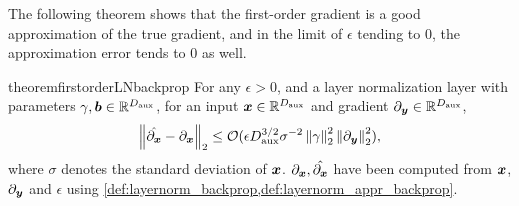 The following theorem shows that the first-order gradient is a good approximation of the true gradient, and in the limit of $\epsilon$ tending to $0$, the approximation error tends to $0$ as well.


\begin{restatable}{theorem}{firstorderLNbackprop}\label{thm:first_order_LN_backprop}
For any $\epsilon > 0$, and a layer normalization layer with parameters $\mathbf{\gamma}, {\bm{b}}\in \mathbb{R}^{ D_{\text{aux}} }$, for an input ${\bm{x}} \in \mathbb{R}^{ D_{\text{aux}} }$ and gradient $\partial_{{\bm{y}}} \in \mathbb{R}^{ D_{\text{aux}} }$, 
\begin{align*}
    \left\| \Hat{\partial_{{\bm{x}}}} - \partial_{{\bm{x}}} \right\|_2 \le \mathcal{O} ( \epsilon D_{\text{aux}}^{3/2} \sigma^{-2} \left\|\mathbf{\gamma}\right\|_2^2 \left\|  \partial_{{\bm{y}}} \right\|^2_2 ),
\end{align*}
where $\sigma$ denotes the standard deviation of ${\bm{x}}$. $\partial_{{\bm{x}}}, \Hat{\partial_{ {\bm{x}} }}$ have been computed from ${\bm{x}}$, $\partial_{{\bm{y}}}$ and $\epsilon$ using  \cref{def:layernorm_backprop,def:layernorm_appr_backprop}.
\end{restatable}

